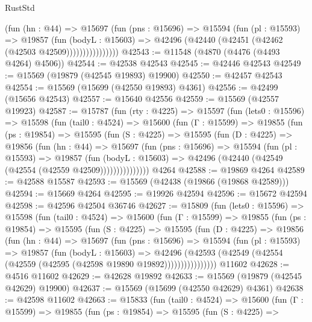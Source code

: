 \begin{lexlean}{RustStd}
\begin{coremodule}
                    (fun (hn : @44) =>
                    @15697
                      (fun (pns : @15696) =>
                      @15594
                        (fun (pl : @15593) =>
                        @19857
                          (fun (bodyL : @15603) =>
                          @42496 (@42440 (@42451 (@42462 (@42503 @42509))))))))))))))))
@42543 := @11548 (@4870 (@4476 (@4493 @4264) @4506))
@42544 := @42538 @42543
@42545 := @42446 @42543
@42549 := @15569 (@19879 (@42545 @19893) @19900)
@42550 := @42457 @42543
@42554 := @15569 (@15699 (@42550 @19893) @4361)
@42556 := @42499 (@15656 @42543)
@42557 := @15640 @42556
@42559 := @15569 (@42557 @19923)
@42587 := @15787
    (fun (rty : @4225) =>
    @15597
      (fun (lets0 : @15596) =>
      @15598
        (fun (tail0 : @4524) =>
        @15600
          (fun (Γ : @15599) =>
          @19855
            (fun (ps : @19854) =>
            @15595
              (fun (S : @4225) =>
              @15595
                (fun (D : @4225) =>
                @19856
                  (fun (hn : @44) =>
                  @15697
                    (fun (pns : @15696) =>
                    @15594
                      (fun (pl : @15593) =>
                      @19857
                        (fun (bodyL : @15603) =>
                        @42496 (@42440 (@42549 (@42554 (@42559 @42509)))))))))))))))
    @4264
@42588 := @19869 @4264
@42589 := @42588 @15587
@42593 := @15569 (@42438 (@19866 (@19868 @42589)))
@42594 := @15669 @4264
@42595 := @19926 @42594
@42596 := @15672 @42594
@42598 := @42596 @42504 @36746
@42627 := @15809
    (fun (lets0 : @15596) =>
    @15598
      (fun (tail0 : @4524) =>
      @15600
        (fun (Γ : @15599) =>
        @19855
          (fun (ps : @19854) =>
          @15595
            (fun (S : @4225) =>
            @15595
              (fun (D : @4225) =>
              @19856
                (fun (hn : @44) =>
                @15697
                  (fun (pns : @15696) =>
                  @15594
                    (fun (pl : @15593) =>
                    @19857
                      (fun (bodyL : @15603) =>
                      @42496
                        (@42593
                          (@42549 (@42554 (@42559 (@42595 (@42598 @19890 @19892))))))))))))))))
    @11602
@42628 := @4516 @11602
@42629 := @42628 @19892
@42633 := @15569 (@19879 (@42545 @42629) @19900)
@42637 := @15569 (@15699 (@42550 @42629) @4361)
@42638 := @42598 @11602
@42663 := @15833
    (fun (tail0 : @4524) =>
    @15600
      (fun (Γ : @15599) =>
      @19855
        (fun (ps : @19854) =>
        @15595
          (fun (S : @4225) =>

\end{coremodule}
\end{lexlean}
